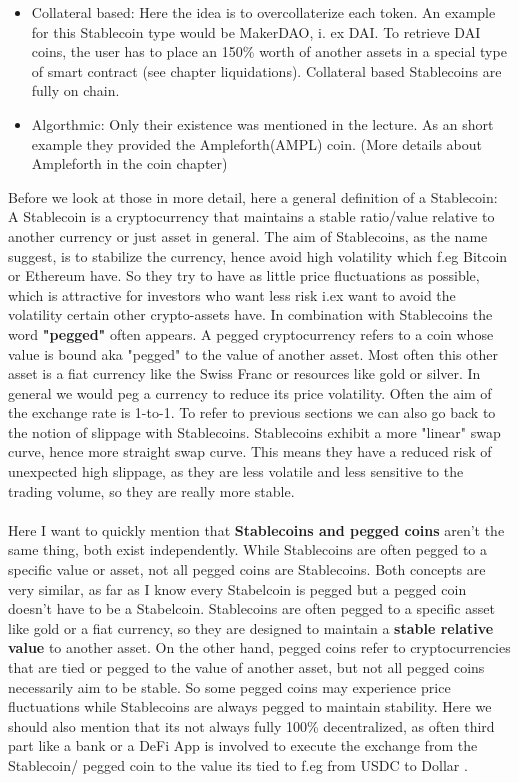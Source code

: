 \documentclass{article}
\begin{document}
\begin{itemize}
    \item {Collateral based}: Here the idea is to overcollaterize each token. An example for this Stablecoin type would be MakerDAO, i. ex DAI. To retrieve DAI coins, the user has to place an 150\% worth of another assets in a special type of smart contract (see chapter liquidations). Collateral based Stablecoins are fully on chain.
    \item {Algorthmic}: Only their existence was mentioned in the lecture. As an short example they provided the Ampleforth(AMPL) coin. (More details about Ampleforth in the coin chapter)
\end{itemize}Before we look at those in more detail, here a general definition of a Stablecoin: A Stablecoin is a cryptocurrency that maintains a stable ratio/value relative to another currency or just asset in general. The aim of Stablecoins, as the name suggest, is to stabilize the currency, hence avoid high volatility which f.eg Bitcoin or Ethereum have. So they try to have as little price fluctuations as possible, which is attractive for investors who want less risk i.ex want to avoid the volatility certain other crypto-assets have.
In combination with Stablecoins the word  \textbf{"pegged" }often appears. A pegged cryptocurrency refers to a coin whose value is bound aka "pegged" to the value of another asset. Most often this other asset is a fiat currency like the Swiss Franc or resources like gold or silver. In general we would peg a currency to reduce its price volatility. Often the aim of the exchange rate is 1-to-1. To refer to previous sections we can also go back to the notion of slippage with Stablecoins. Stablecoins exhibit a more "linear" swap curve, hence more straight swap curve. This means they have a reduced risk of unexpected high slippage, as they are less volatile and less sensitive to the trading volume, so they are really more stable.\\
\\
Here I want to quickly mention that \textbf{Stablecoins and pegged coins} aren't the same thing, both exist independently. While Stablecoins are often pegged to a specific value or asset, not all pegged coins are Stablecoins. Both concepts are very similar, as far as I know every Stabelcoin is pegged but a pegged coin doesn't have to be a Stabelcoin. Stablecoins are often pegged to a specific asset like gold or a fiat currency, so they are designed to maintain a \textbf{stable relative value} to another asset. On the other hand, pegged coins refer to cryptocurrencies that are tied or pegged to the value of another asset, but not all pegged coins necessarily aim to be stable. So some pegged coins may experience price fluctuations while Stablecoins are always pegged to maintain stability. Here we should also mention that its not always fully 100\% decentralized, as often  third part like a bank or a DeFi App is involved to execute the exchange from the Stablecoin/ pegged coin to the value its tied to f.eg from USDC to Dollar .\\
\end{document}
